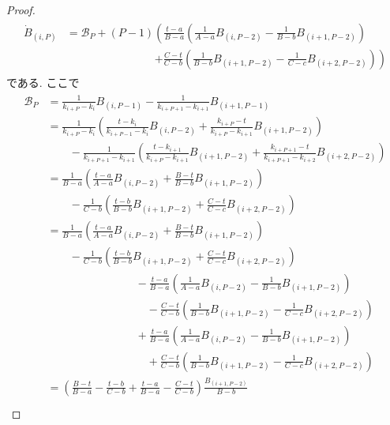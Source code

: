 \documentclass{jsarticle}
\newcommand\Pare[1]{\left(#1\right)}
\theoremstyle{definition}%
\begin{document}
\begin{proof}
	\begin{align}
		\label{Eqn383}
		\begin{aligned}
			\dot{B}_{(i,P)}
			&=\mathcal{B}_P
			+(P-1)
			\left(
			\frac{t-a}{B-a}\Pare{\frac{1}{A-a}B_{(i,P-2)}-\frac{1}{B-b}B_{(i+1,P-2)}}
			\right. \\
			&\hspace{8em}\left.
			+\frac{C-t}{C-b}\Pare{\frac{1}{B-b}B_{(i+1,P-2)}-\frac{1}{C-c}B_{(i+2,P-2)}}
			\right)
		\end{aligned}
	\end{align}
	である.
	ここで
	\begin{align}
		\label{Eqn384}
		\begin{aligned}
			\mathcal{B}_P
			&=\frac{1}{k_{i+P}-k_{i}}B_{(i,P-1)}-\frac{1}{k_{i+P+1}-k_{i+1}}B_{(i+1,P-1)} \\
			&=\frac{1}{k_{i+P}-k_{i}}\Pare{\frac{t-k_{i}}{k_{i+P-1}-k_{i}}B_{(i,P-2)}+\frac{k_{i+P}-t}{k_{i+P}-k_{i+1}}B_{(i+1,P-2)}} \\
			&\qquad-\frac{1}{k_{i+P+1}-k_{i+1}}\Pare{\frac{t-k_{i+1}}{k_{i+P}-k_{i+1}}B_{(i+1,P-2)}+\frac{k_{i+P+1}-t}{k_{i+P+1}-k_{i+2}}B_{(i+2,P-2)}} \\
			&=\frac{1}{B-a}\Pare{\frac{t-a}{A-a}B_{(i,P-2)}+\frac{B-t}{B-b}B_{(i+1,P-2)}} \\
			&\qquad-\frac{1}{C-b}\Pare{\frac{t-b}{B-b}B_{(i+1,P-2)}+\frac{C-t}{C-c}B_{(i+2,P-2)}} \\
			&=\frac{1}{B-a}\Pare{\frac{t-a}{A-a}B_{(i,P-2)}+\frac{B-t}{B-b}B_{(i+1,P-2)}} \\
			&\qquad-\frac{1}{C-b}\Pare{\frac{t-b}{B-b}B_{(i+1,P-2)}+\frac{C-t}{C-c}B_{(i+2,P-2)}} \\
			&\hspace{7em}\quad-\frac{t-a}{B-a}\Pare{\frac{1}{A-a}B_{(i,P-2)}-\frac{1}{B-b}B_{(i+1,P-2)}} \\
			&\hspace{7em}\qquad-\frac{C-t}{C-b}\Pare{\frac{1}{B-b}B_{(i+1,P-2)}-\frac{1}{C-c}B_{(i+2,P-2)}} \\
			&\hspace{7em}\quad+\frac{t-a}{B-a}\Pare{\frac{1}{A-a}B_{(i,P-2)}-\frac{1}{B-b}B_{(i+1,P-2)}} \\
			&\hspace{7em}\qquad+\frac{C-t}{C-b}\Pare{\frac{1}{B-b}B_{(i+1,P-2)}-\frac{1}{C-c}B_{(i+2,P-2)}} \\
			&=\Pare{\frac{B-t}{B-a}-\frac{t-b}{C-b}+\frac{t-a}{B-a}-\frac{C-t}{C-b}}\frac{B_{(i+1,P-2)}}{B-b} \\

\end{aligned}
\end{align}
\end{proof}
\end{document}
